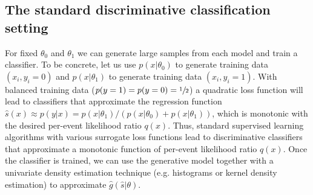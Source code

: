 \documentclass[11pt, oneside]{article}   	%
\begin{document}
\subsection{The standard discriminative classification setting} 
For fixed $\theta_0$ and $\theta_1$ we can generate 
large samples from each model and train a classifier. To be concrete, let us use $p(x|\theta_0)$ to generate training 
data $(x_i,  y_i=0)$ and $p(x|\theta_1)$ to generate training data $(x_i , y_i=1)$. With balanced training data   ($p(y=1)=p(y=0)=\sfrac{1}{2}$) a quadratic loss function will lead to classifiers that approximate the regression function  $\hat{s}(x) \approx p(y|x) = p(x|\theta_1)/(p(x|\theta_0)+p(x|\theta_1))$, which is  monotonic with the desired per-event likelihood ratio $q(x)$. Thus, standard supervised learning algorithms with various surrogate loss functions lead to discriminative classifiers that approximate a monotonic function of per-event likelihood ratio $q(x)$.  Once the classifier is trained, we can use the generative model together with a univariate density estimation technique (e.g. histograms or kernel density estimation) to approximate $\hat{g}(\hat{s}|\theta)$.


%
%

\end{document}
